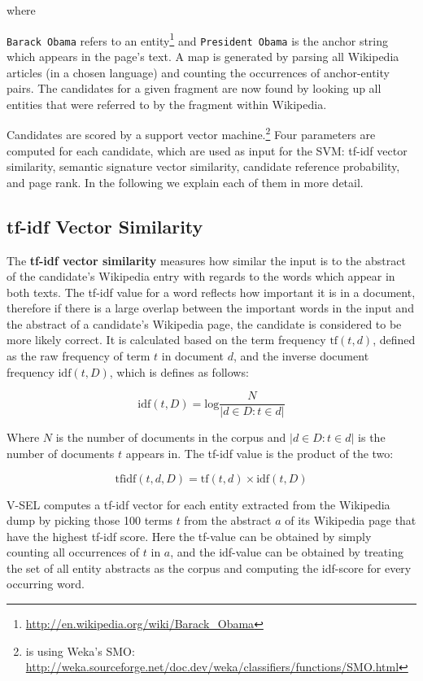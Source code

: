 \documentclass[runningheads,a4paper]{llncs}
\begin{document}
where {\texttt{Barack Obama} refers to an entity\footnote{\url{http://en.wikipedia.org/wiki/Barack_Obama}} and \texttt{President Obama} is the anchor string which appears in the page's text. A map is generated by parsing all Wikipedia articles (in a chosen language) and counting the occurrences of anchor-entity pairs. The candidates for a given fragment are now found by looking up all entities that were referred to by the fragment within Wikipedia. 

Candidates are scored by a support vector machine.\footnote{{\acronym} is using Weka's SMO: \url{http://weka.sourceforge.net/doc.dev/weka/classifiers/functions/SMO.html}} Four parameters are computed for each candidate, which are used as input for the SVM: tf-idf vector similarity, semantic signature vector similarity, candidate reference probability, and page rank. In the following we explain each of them in more detail.

\subsection{tf-idf Vector Similarity}

The \textbf{tf-idf vector similarity} measures how similar the input is to the abstract of the candidate's Wikipedia entry with regards to the words which appear in both texts. The tf-idf value for a word reflects how important it is in a document, therefore if there is a large overlap between the important words in the input and the abstract of a candidate's Wikipedia page, the candidate is considered to be more likely correct. It is calculated based on the term frequency $\mathrm{tf}(t,d)$, defined as the raw frequency of term $t$ in document $d$, and the inverse document frequency $\mathrm{idf}(t,D)$, which is defines as follows:

$$\mathrm{idf}(t, D) = \mathrm{log}\frac{N}{|{d \in D : t \in d}|}$$

Where $N$ is the number of documents in the corpus and $|{d \in D : t \in d}|$ is the number of documents $t$ appears in. The tf-idf value is the product of the two:

$$ \mathrm{tfidf}(t, d, D) = \mathrm{tf}(t, d) \times \mathrm{idf}(t, D) $$

V-SEL computes a tf-idf vector for each entity extracted from the Wikipedia dump by picking those 100 terms $t$ from the abstract $a$ of its Wikipedia page that have the highest tf-idf score. Here the tf-value can be obtained by simply counting all occurrences of $t$ in $a$, and the idf-value can be obtained by treating the set of all entity abstracts as the corpus and computing the idf-score for every occurring word. 

}
\end{document}
